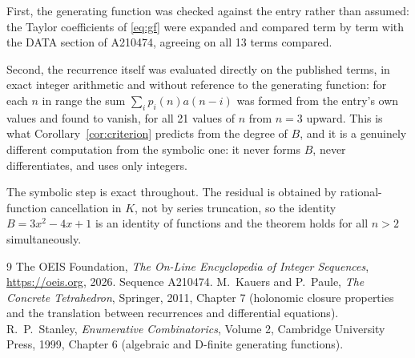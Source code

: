 \documentclass[11pt,a4paper]{article}
\theoremstyle{plain}
\theoremstyle{definition}
\begin{document}
First, the generating function was checked against the entry rather than assumed: the
Taylor coefficients of \eqref{eq:gf} were expanded and compared term by term with the DATA
section of A210474, agreeing on all 13 terms compared.

Second, the recurrence itself was evaluated directly on the published terms, in exact
integer arithmetic and without reference to the generating function: for each $n$ in range
the sum $\sum_{i}p_{i}(n)a(n-i)$ was formed from the entry's own values and found to
vanish, for all 21 values of $n$ from $n=3$ upward. This is what
Corollary~\ref{cor:criterion} predicts from the degree of $B$, and it is a genuinely
different computation from the symbolic one: it never forms $B$, never differentiates, and
uses only integers.

The symbolic step is exact throughout. The residual is obtained by rational-function
cancellation in $K$, not by series truncation, so the identity $B=3 x^{2} - 4 x + 1$ is an
identity of functions and the theorem holds for all $n>2$ simultaneously.

\begin{thebibliography}{9}
 The OEIS Foundation, \emph{The On-Line Encyclopedia of Integer Sequences},
\url{https://oeis.org}, 2026. Sequence A210474.
 M.~Kauers and P.~Paule, \emph{The Concrete Tetrahedron}, Springer, 2011,
Chapter 7 (holonomic closure properties and the translation between recurrences and
differential equations).
 R.~P.~Stanley, \emph{Enumerative Combinatorics}, Volume 2, Cambridge
University Press, 1999, Chapter 6 (algebraic and D-finite generating functions).
\end{thebibliography}
\end{document}
